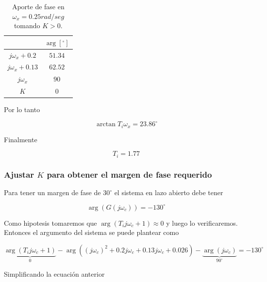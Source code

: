 \documentclass{article}
\begin{document}
        \begin{table}[H]
            \centering
            \begin{tabular}{|c|c|}
                \hline & $\arg [^\circ]$ \\ 
                \hline $j\omega_x + 0.2$ & $51.34$ \\
                \hline $j\omega_x + 0.13$ & $62.52$ \\
                \hline $j\omega_x$ & $90$ \\
                \hline $K$ & $0$ \\
                \hline
            \end{tabular}
            \caption{Aporte de fase en $\omega_x=0.25rad/seg$ tomando $K>0$.}
        \end{table}

        Por lo tanto 

        \begin{equation}
            \arctan{ T_i \omega_x } = 23.86^\circ
        \end{equation}

        Finalmente 

        \begin{equation}
            T_i = 1.77
        \end{equation}

        \subsubsection{Ajustar $K$ para obtener el margen de fase requerido}

        Para tener un margen de fase de $30^\circ$ el sistema en lazo abierto debe tener 

        \begin{equation}
            \arg(G(j\omega_c)) = -130^{\circ}
        \end{equation}

        Como hipotesis tomaremos que $\arg( T_ij\omega_c + 1 )\approx 0$ y luego lo verificaremos. Entonces el 
        argumento del sistema se puede plantear como 

        \begin{equation}
           \underbrace{\arg( T_ij\omega_c + 1 )}_{0} - \arg( (j\omega_c)^2 +0.2j\omega_c + 0.13j\omega_c + 0.026 ) - \underbrace{\arg(j\omega_c)}_{90^\circ} = -130^\circ
        \end{equation}

        Simplificando la ecuación anterior 
\end{document}
